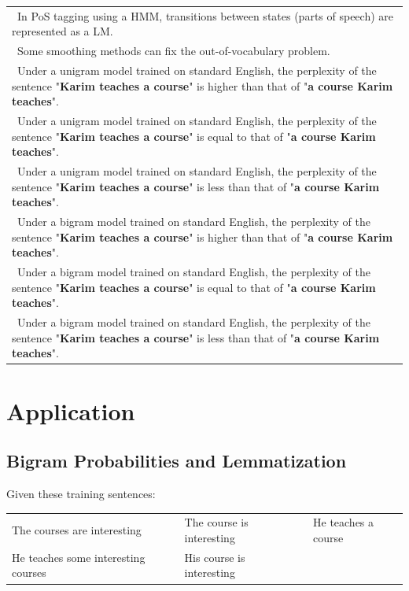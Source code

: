 \documentclass{../extra/aakpract/aakpract}
\begin{document}
	\begin{longtable}{|p{}|}
		\hline 
		\Square\ In PoS tagging using a HMM, transitions between states (parts of speech) are represented as a LM. \\
		\Square\ Some smoothing methods can fix the out-of-vocabulary problem. \\
		\Square\ Under a unigram model trained on standard English, the perplexity of the sentence "\textbf{Karim teaches a course}" is higher than that of "\textbf{a course Karim teaches}". \\
		\Square\ Under a unigram model trained on standard English, the perplexity of the sentence "\textbf{Karim teaches a course}" is equal to that of "\textbf{a course Karim teaches}".\\
		\Square\ Under a unigram model trained on standard English, the perplexity of the sentence "\textbf{Karim teaches a course}" is less than that of "\textbf{a course Karim teaches}".\\
		\Square\ Under a bigram model trained on standard English, the perplexity of the sentence "\textbf{Karim teaches a course}" is higher than that of "\textbf{a course Karim teaches}". \\
		\Square\ Under a bigram model trained on standard English, the perplexity of the sentence "\textbf{Karim teaches a course}" is equal to that of "\textbf{a course Karim teaches}".\\
		\Square\ Under a bigram model trained on standard English, the perplexity of the sentence "\textbf{Karim teaches a course}" is less than that of "\textbf{a course Karim teaches}".\\
		\hline
	\end{longtable}
	
	\newpage
	\section{Application}
	
	\subsection{Bigram Probabilities and Lemmatization}
	
	Given these training sentences:  
	\begin{center}
		\begin{tabular}{|lllll|}
		\hline
		The courses are interesting && The course is interesting && He teaches a course \\
		He teaches some interesting courses && His course is interesting &&\\
		\hline
		\end{tabular}
	\end{center}
	
\end{document}

